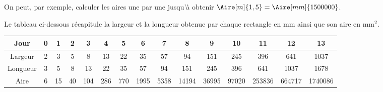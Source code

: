 \vfill



    On peut, par exemple, calculer les aires une par une jusqu'à obtenir $\Aire[m]{1,5} = \Aire[mm]{1500000}$. \par
    Le tableau ci-dessous récapitule la largeur et la longueur obtenue par chaque rectangle en mm ainsi que son aire en mm$^2$.
    \begin{center}
        {
        \begin{tabular}{|*{15}{c|}}
            \hline
            Jour & 0 & 1 & 2 & 3 & 4 & 5 & 6 & 7 & 8 & 9 & 10 & 11 & 12 & 13 \\
            \hline
            Largeur & 2 & 3 & 5 & 8 & 13 & 22 & 35 & 57 & 94 & 151 & 245 & 396 & 641 & \num{1037} \\
            \hline
            Longueur & 3 & 5 & 8 & 13 & 22 & 35 & 57 & 94 & 151 & 245 & 396 & 641 & \num{1037} & \num{1678} \\
            \hline
            Aire & 6 & 15 & 40 & 104 & 286 & 770 & \num{1995} & \num{5358} & \num{14194} & \num{36995} & \num{97020} & \num{253836} & \num{664717} & \num{1740086} \\
            \hline
        \end{tabular}}
    \end{center}
      
\pagebreak



